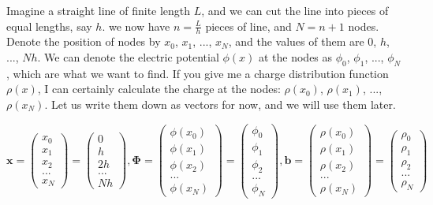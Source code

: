 \documentclass[paper=a4,fontsize=11pt]{scrartcl} %
\begin{document}
Imagine a straight line of finite length $L$, and we can cut the line into pieces of equal lengths, say $h$. we now have $n=\frac{L}{h}$ pieces of line, and $N=n+1$ nodes. Denote the position of nodes by $x_0$, $x_1$, ..., $x_N$, and the values of them are $0$, $h$, ..., $Nh$. We can denote the electric potential $\phi(x)$ at the nodes as $\phi_0$, $\phi_1$, ..., $\phi_N$, which are what we want to find. If you give me a charge distribution function $\rho(x)$, I can certainly calculate the charge at the nodes: $\rho(x_0)$, $\rho(x_1)$, ..., $\rho(x_N)$. Let us write them down as vectors for now, and we will use them later.

\begin{equation}
\mathbf{x}=
    \begin{pmatrix}
    x_0 \\
    x_1 \\
    x_2 \\
    ... \\
    x_N
    \end{pmatrix}=
    \begin{pmatrix}
    0 \\
    h \\
    2h \\
    ... \\
    Nh
    \end{pmatrix},
    \mathbf{\Phi}=
    \begin{pmatrix}
    \phi(x_0) \\
    \phi(x_1) \\
    \phi(x_2) \\
    ... \\
    \phi(x_N)
    \end{pmatrix}=
    \begin{pmatrix}
    \phi_0 \\
    \phi_1 \\
    \phi_2 \\
    ... \\
    \phi_N
    \end{pmatrix},
    \mathbf{b}=
    \begin{pmatrix}
    \rho(x_0) \\
    \rho(x_1) \\
    \rho(x_2) \\
    ... \\
    \rho(x_N)
    \end{pmatrix}=
    \begin{pmatrix}
    \rho_0 \\
    \rho_1 \\
    \rho_2 \\
    ... \\
    \rho_N
    \end{pmatrix}
\end{equation}
\end{document}
